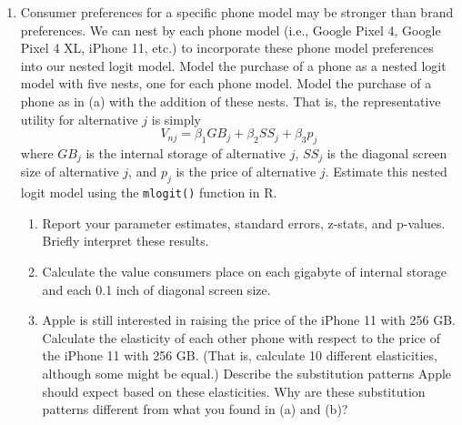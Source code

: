 \documentclass[11pt,letterpaper]{article}\usepackage[]{graphicx}\usepackage[]{color}
\begin{document}
\begin{enumerate}[label=\alph*., leftmargin=*]
	\item Consumer preferences for a specific phone model may be stronger than brand preferences. We can nest by each phone model (i.e., Google Pixel 4, Google Pixel 4 XL, iPhone 11, etc.) to incorporate these phone model preferences into our nested logit model. Model the purchase of a phone as a nested logit model with five nests, one for each phone model. Model the purchase of a phone as in (a) with the addition of these nests. That is, the representative utility for alternative $j$ is simply
	$$V_{nj} = \beta_1 GB_j + \beta_2 SS_j + \beta_3 p_j$$
	where $GB_j$ is the internal storage of alternative $j$, $SS_j$ is the diagonal screen size of alternative $j$, and $p_j$ is the price of alternative $j$. Estimate this nested logit model using the \texttt{mlogit()} function in R. 
	\begin{enumerate}[label=\roman*.]
		\item Report your parameter estimates, standard errors, z-stats, and p-values. Briefly interpret these results. 
		\item Calculate the value consumers place on each gigabyte of internal storage and each 0.1 inch of diagonal screen size.
		\item Apple is still interested in raising the price of the iPhone 11 with 256 GB. Calculate the elasticity of each other phone with respect to the price of the iPhone 11 with 256 GB. (That is, calculate 10 different elasticities, although some might be equal.) Describe the substitution patterns Apple should expect based on these elasticities. Why are these substitution patterns different from what you found in (a) and (b)?
	\end{enumerate}


\end{enumerate}
\end{document}
